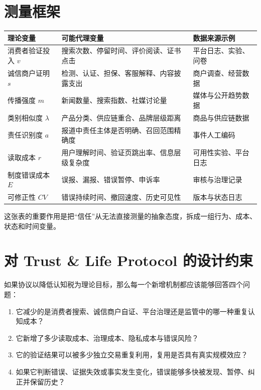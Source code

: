 \documentclass[UTF8,12pt]{ctexart}
\begin{document}
\section{测量框架}

\begin{center}
\begin{tabularx}{\textwidth}{@{}p{}p{}X@{}}
\toprule
\textbf{理论变量} & \textbf{可能代理变量} & \textbf{数据来源示例} \\
\midrule
消费者验证投入 $v$ & 搜索次数、停留时间、评价阅读、证书点击 & 平台日志、实验、问卷 \\
诚信商户证明 $s$ & 检测、认证、担保、客服解释、内容披露支出 & 商户调查、经营数据 \\
传播强度 $m$ & 新闻数量、搜索指数、社媒讨论量 & 媒体与公开趋势数据 \\
类别相似度 $\lambda$ & 产品分类、供应链重合、品牌层级距离 & 商品与供应链数据 \\
责任识别度 $a$ & 报道中责任主体是否明确、召回范围精确度 & 事件人工编码 \\
读取成本 $r$ & 用户理解时间、验证页跳出率、信息层级复杂度 & 可用性实验、平台日志 \\
制度错误成本 $E$ & 误报、漏报、错误暂停、申诉率 & 审核与治理记录 \\
可修正性 $CV$ & 错误持续时间、撤回速度、历史可见性 & 版本与状态日志 \\
\bottomrule
\end{tabularx}
\end{center}

这张表的重要作用是把“信任”从无法直接测量的抽象态度，拆成一组行为、成本、状态和时间变量。

\section{对 Trust \& Life Protocol 的设计约束}

如果协议以降低认知税为理论目标，那么每一个新增机制都应该能够回答四个问题：

\begin{enumerate}[leftmargin=2.2em]
  \item 它减少的是消费者搜索、诚信商户自证、平台治理还是监管中的哪一种重复认知成本？
  \item 它新增了多少读取成本、治理成本、隐私成本与错误风险？
  \item 它的验证结果可以被多少独立交易重复利用，复用是否具有真实规模效应？
  \item 如果它判断错误、证据失效或事实发生变化，错误能够多快被发现、暂停、纠正并保留历史？
\end{enumerate}
\end{document}
